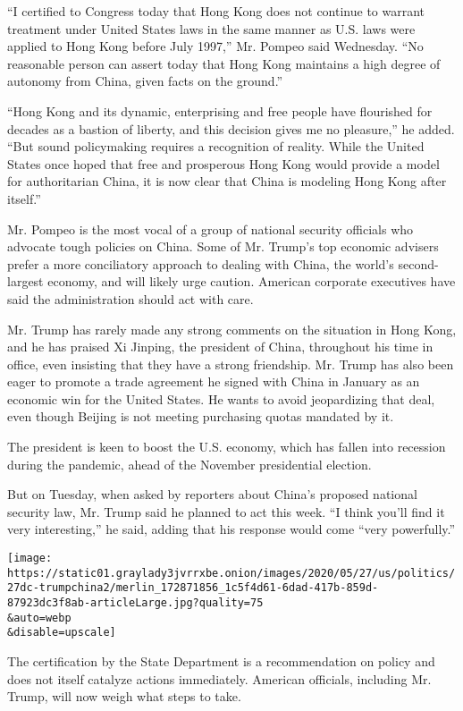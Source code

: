 ``I certified to Congress today that Hong Kong does not continue to
warrant treatment under United States laws in the same manner as U.S.
laws were applied to Hong Kong before July 1997,'' Mr. Pompeo said
Wednesday. ``No reasonable person can assert today that Hong Kong
maintains a high degree of autonomy from China, given facts on the
ground.''

``Hong Kong and its dynamic, enterprising and free people have
flourished for decades as a bastion of liberty, and this decision gives
me no pleasure,'' he added. ``But sound policymaking requires a
recognition of reality. While the United States once hoped that free and
prosperous Hong Kong would provide a model for authoritarian China, it
is now clear that China is modeling Hong Kong after itself.''

Mr. Pompeo is the most vocal of a group of national security officials
who advocate tough policies on China. Some of Mr. Trump's top economic
advisers prefer a more conciliatory approach to dealing with China, the
world's second-largest economy, and will likely urge caution. American
corporate executives have said the administration should act with care.

Mr. Trump has rarely made any strong comments on the situation in Hong
Kong, and he has praised Xi Jinping, the president of China, throughout
his time in office, even insisting that they have a strong friendship.
Mr. Trump has also been eager to promote a trade agreement he signed
with China in January as an economic win for the United States. He wants
to avoid jeopardizing that deal, even though Beijing is not meeting
purchasing quotas mandated by it.

The president is keen to boost the U.S. economy, which has fallen into
recession during the pandemic, ahead of the November presidential
election.

But on Tuesday, when asked by reporters about China's proposed national
security law, Mr. Trump said he planned to act this week. ``I think
you'll find it very interesting,'' he said, adding that his response
would come ``very powerfully.''

\texttt{[image: https://static01.graylady3jvrrxbe.onion/images/2020/05/27/us/politics/27dc-trumpchina2/merlin\_172871856\_1c5f4d61-6dad-417b-859d-87923dc3f8ab-articleLarge.jpg?quality=75\\\&auto=webp\\\&disable=upscale]}

The certification by the State Department is a recommendation on policy
and does not itself catalyze actions immediately. American officials,
including Mr. Trump, will now weigh what steps to take.

